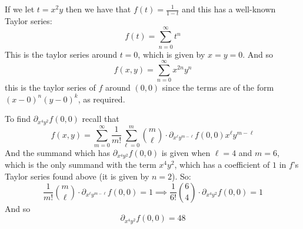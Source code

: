 \documentclass[10pt]{article}
\begin{document}
\begin{blankpp}

    If we let $t=x^2y$ then we have that $f(t)=\frac1{1-t}$ and this has a well-known Taylor series:
    \[ f(t) = \sum_{n=0}^\infty t^n \]
    This is the taylor series around $t=0$, which is given by $x=y=0$.
    And so
    \[ f(x,y) = \sum_{n=0}^\infty x^{2n}y^n \]
    this is the taylor series of $f$ around $(0,0)$ since the terms are of the form $(x-0)^n(y-0)^k$, as required.

    To find $\partial_{x^4y^2}f(0,0)$ recall that
    \[ f(x,y) = \sum_{m=0}^\infty\frac1{m!}\sum_{\ell=0}^m\binom m\ell\cdot\partial_{x^\ell y^{m-\ell}}f(0,0)x^\ell y^{m-\ell} \]
    And the summand which has $\partial_{x^4y^2}f(0,0)$ is given when $\ell=4$ and $m=6$, which is the only summand with the term $x^4y^2$, which has a coefficient of $1$ in $f$'s Taylor series found above
    (it is given by $n=2$).
    So:
    \[ \frac1{m!}\binom m\ell\cdot\partial_{x^\ell y^{m-\ell}}f(0,0) = 1 \implies \frac1{6!}\binom64\cdot\partial_{x^4y^2}f(0,0)=1 \]
    And so
    \[ \partial_{x^4y^2}f(0,0) = 48 \]

\end{blankpp}
\end{document}
